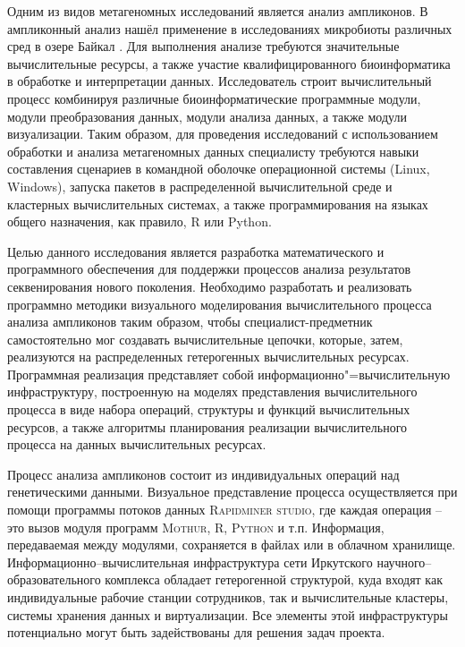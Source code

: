 \documentclass[12pt]{llncs}  %
\begin{document}
Одним из видов метагеномных исследований является анализ ампликонов. В ампликонный анализ нашёл применение в исследованиях микробиоты различных сред в озере Байкал \cite{underice}.  Для выполнения анализе требуются значительные вычислительные ресурсы, а также участие квалифицированного биоинформатика в обработке и интерпретации данных.  Исследователь строит вычислительный процесс комбинируя различные биоинформатические программные модули, модули преобразования данных, модули анализа данных, а также модули визуализации.  Таким образом, для проведения исследований с использованием обработки и анализа метагеномных данных специалисту требуются навыки составления сценариев в командной оболочке операционной системы (Linux, Windows), запуска пакетов в распределенной вычислительной среде и кластерных вычислительных системах, а также программирования на языках общего назначения, как правило, R или Python.

Целью данного исследования является разработка математического и программного обеспечения для поддержки процессов анализа результатов секвенирования нового поколения.  Необходимо разработать и реализовать программно методики визуального моделирования вычислительного процесса анализа ампликонов таким образом, чтобы специалист-предметник самостоятельно мог создавать вычислительные цепочки, которые, затем, реализуются на распределенных гетерогенных вычислительных ресурсах.  Программная реализация представляет собой информационно"=вычислительную инфраструктуру, построенную на моделях представления вычислительного процесса в виде набора операций, структуры и функций вычислительных ресурсов, а также алгоритмы планирования реализации вычислительного процесса на данных вычислительных ресурсах.

Процесс анализа ампликонов состоит из индивидуальных операций над генетическими данными.  Визуальное представление процесса осуществляется при помощи программы потоков данных \cite{dataflow} \textsc{Rapidminer studio}, где каждая операция -- это вызов модуля программ \textsc{Mothur}, \textsc{R}, \textsc{Python} и т.п.  Информация, передаваемая между модулями, сохраняется в файлах или в облачном хранилище.  Информационно--вычислительная инфраструктура сети Иркутского научного--образовательного комплекса обладает гетерогенной структурой, куда входят как индивидуальные рабочие станции сотрудников, так и вычислительные кластеры, системы хранения данных и виртуализации.  Все элементы этой инфраструктуры потенциально могут быть задействованы для решения задач проекта.
\end{document}
